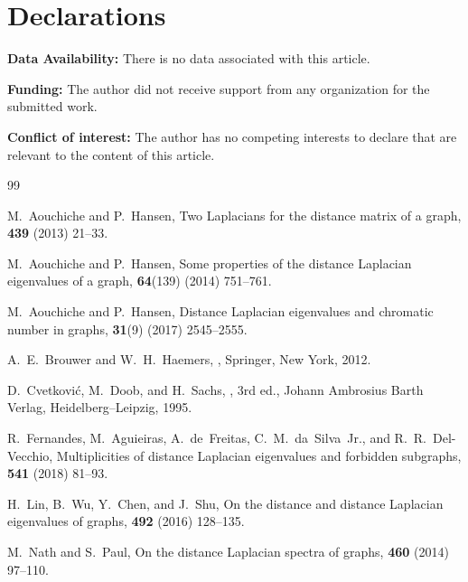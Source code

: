 \documentclass[12pt]{article}
\theoremstyle{plain}
\theoremstyle{definition}
\begin{document}
\section*{Declarations}
\noindent\textbf{Data Availability:} There is no data associated with this article.

\noindent\textbf{Funding:} The author did not receive support from any organization for the submitted work.

\noindent\textbf{Conflict of interest:} The author has no competing interests to declare that are relevant to the content of this article.

\begin{thebibliography}{99}

M.~Aouchiche and P.~Hansen,
\newblock Two Laplacians for the distance matrix of a graph,
 \textbf{439} (2013) 21--33.

M.~Aouchiche and P.~Hansen,
\newblock Some properties of the distance Laplacian eigenvalues of a graph,
 \textbf{64}(139) (2014) 751--761.

M.~Aouchiche and P.~Hansen,
\newblock Distance Laplacian eigenvalues and chromatic number in graphs,
 \textbf{31}(9) (2017) 2545--2555.

A.~E.~Brouwer and W.~H.~Haemers,
,
\newblock Springer, New York, 2012.

D.~Cvetkovi\'c, M.~Doob, and H.~Sachs,
, 3rd ed.,
\newblock Johann Ambrosius Barth Verlag, Heidelberg--Leipzig, 1995.

R.~Fernandes, M.~Aguieiras, A.~de~Freitas, C.~M.~da~Silva~Jr., and R.~R.~Del-Vecchio,
\newblock Multiplicities of distance Laplacian eigenvalues and forbidden subgraphs,
 \textbf{541} (2018) 81--93.

H.~Lin, B.~Wu, Y.~Chen, and J.~Shu,
\newblock On the distance and distance Laplacian eigenvalues of graphs,
 \textbf{492} (2016) 128--135.

M.~Nath and S.~Paul,
\newblock On the distance Laplacian spectra of graphs,
 \textbf{460} (2014) 97--110.


\end{thebibliography}
\end{document}
